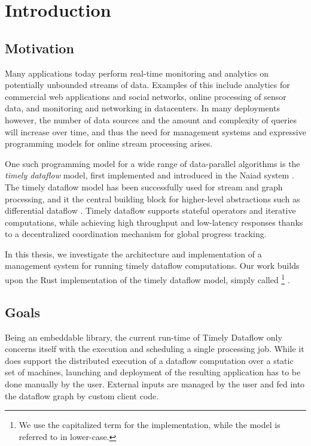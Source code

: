 \chapter{Introduction}\label{ch:introduction}

\section{Motivation}

Many applications today perform real-time monitoring and analytics on
potentially unbounded streams of data. Examples of this include analytics for
commercial web applications and social networks, online processing of sensor
data, and monitoring and networking in datacenters. In many deployments however,
the number of data sources and the amount and complexity of queries will increase
over time, and thus the need for management systems and expressive programming
models for online stream processing arises.

One such programming model for a wide range of data-parallel algorithms is
the \emph{timely dataflow} model, first implemented and introduced in the
Naiad system \cite{naiad}. The timely dataflow model has been successfully
used for stream and graph processing, and it the central building block for
higher-level abstractions such as differential dataflow \cite{differential}.
Timely dataflow supports stateful operators and iterative computations, while
achieving high throughput and low-latency responses thanks to a decentralized
coordination mechanism for global progress tracking.

In this thesis, we investigate the architecture and implementation of a
management system for running timely dataflow computations. Our work
builds upon the Rust implementation of the timely dataflow model,
simply called \footnote{We use the capitalized term
for the implementation, while the model is referred to in lower-case.} \cite{timely}.
\section{Goals}

Being an embeddable library, the current run-time of Timely Dataflow only
concerns itself with the execution and scheduling a single processing job.
While it does support the distributed execution of a dataflow computation
over a static set of machines, launching and deployment of the resulting application
has to be done manually by the user. External inputs are managed
by the user and fed into the dataflow graph by custom client code.

